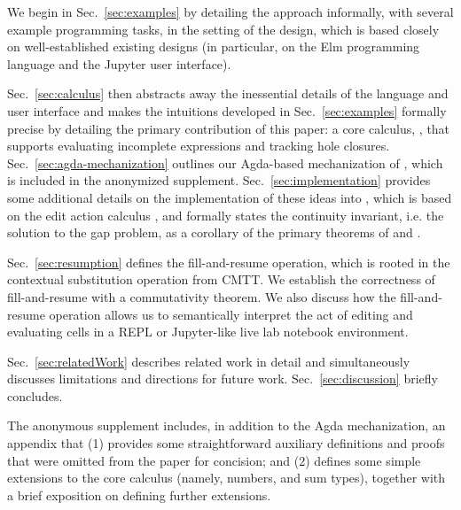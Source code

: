 \vspace{-2px}

\newcommand{\contribution}[2]{\paragraph{#1. #2}} 


We begin in Sec.~\ref{sec:examples} by detailing the approach informally, with several example programming tasks, in the setting of the \Hazel design, which is based closely on well-established existing designs (in particular, on the Elm programming language and the Jupyter user interface). 

Sec.~\ref{sec:calculus} then abstracts away the inessential details of the language and user interface and makes the  intuitions developed in Sec.~\ref{sec:examples} formally precise by detailing the primary contribution of this paper: a core calculus, \HazelnutLive, that supports evaluating incomplete expressions and tracking hole closures. 
Sec.~\ref{sec:agda-mechanization} outlines our Agda-based mechanization of \HazelnutLive, which is included in the anonymized supplement.  
Sec.~\ref{sec:implementation} provides some additional details on the implementation of these ideas into \Hazel, which is based on the \Hazelnut edit action calculus \cite{popl-paper}, and formally states the continuity invariant, i.e. the solution to the gap problem, as a corollary of the primary theorems of \Hazelnut and \HazelnutLive.

Sec.~\ref{sec:resumption} defines the fill-and-resume operation, which is rooted in the contextual substitution operation from CMTT. We establish the correctness of fill-and-resume with a commutativity theorem. We also discuss how the fill-and-resume operation allows us to semantically interpret the act of editing and evaluating cells in a REPL or Jupyter-like live lab notebook environment.

Sec.~\ref{sec:relatedWork} describes related work in detail and simultaneously discusses limitations and directions for future work. Sec.~\ref{sec:discussion} briefly concludes. 

The anonymous supplement includes, in addition to the Agda mechanization, an appendix that (1) provides some straightforward auxiliary definitions and proofs that were omitted from the paper for concision; and (2) defines some simple extensions to the core calculus (namely, numbers, and sum types), together with a brief exposition on defining further extensions. 
